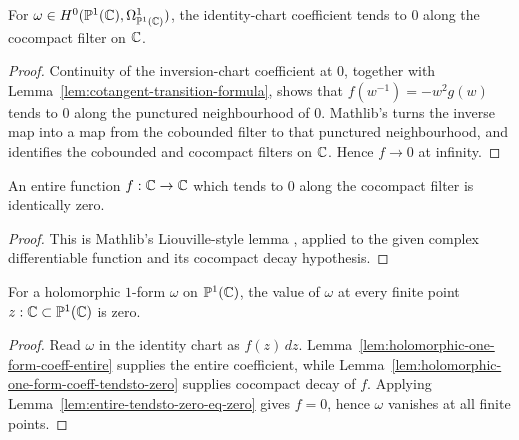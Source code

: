 \begin{lemma}
\label{lem:holomorphic-one-form-coeff-tendsto-zero}
For \(\omega\in H^{0}(\mathbb{P}^{1}(\mathbb{C}),\Omega^{1}_{\mathbb{P}^{1}(\mathbb{C})})\), the identity-chart
coefficient tends to \(0\) along the cocompact filter on \(\mathbb{C}\).
\leanok
\end{lemma}
\begin{proof}\leanok
Continuity of the inversion-chart coefficient at \(0\), together with
Lemma~\ref{lem:cotangent-transition-formula}, shows that
\(f(w^{-1})=-w^{2}g(w)\) tends to \(0\) along the punctured neighbourhood of
\(0\). Mathlib's  turns
the inverse map into a map from the cobounded filter to that punctured
neighbourhood, and  identifies the
cobounded and cocompact filters on \(\mathbb{C}\). Hence \(f\to0\) at infinity.
\end{proof}

\begin{lemma}
\label{lem:entire-tendsto-zero-eq-zero}
An entire function \(f:\mathbb{C}\to\mathbb{C}\) which tends to \(0\) along the
cocompact filter is identically zero.
\leanok
\end{lemma}
\begin{proof}\leanok
This is Mathlib's Liouville-style lemma
, applied to the
given complex differentiable function and its cocompact decay hypothesis.
\end{proof}

\begin{lemma}
\label{lem:onepoint-holomorphic-one-form-finite-vanishing}
For a holomorphic \(1\)-form \(\omega\) on \(\mathbb{P}^{1}(\mathbb{C})\), the value of
\(\omega\) at every finite point \(z:\mathbb{C}\subset\mathbb{P}^{1}(\mathbb{C})\) is zero.
\leanok
\end{lemma}
\begin{proof}\leanok
Read \(\omega\) in the identity chart as \(f(z)\,dz\).
Lemma~\ref{lem:holomorphic-one-form-coeff-entire} supplies the entire coefficient,
while Lemma~\ref{lem:holomorphic-one-form-coeff-tendsto-zero} supplies
cocompact decay of \(f\). Applying
Lemma~\ref{lem:entire-tendsto-zero-eq-zero} gives \(f=0\), hence \(\omega\)
vanishes at all finite points.
\end{proof}

